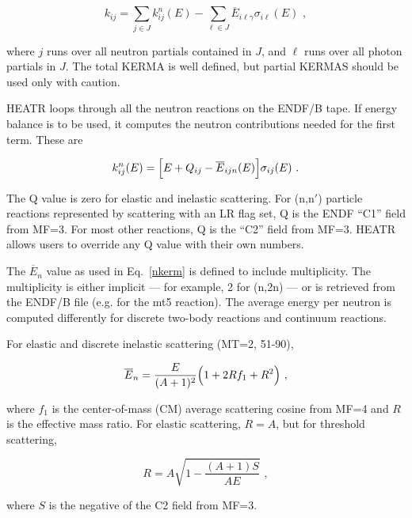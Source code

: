 \begin{equation}
   k_{ij}=\sum_{j\in J}k_{ij}^n(E)-\sum_{\ell\in J}
    \overline{E}_{i\ell\gamma}\sigma_{i\ell}(E)\,\,,
\label{reordered}
\end{equation}
\vspace{0.5 pt}

\noindent
where $j$ runs over all neutron partials contained in $J$, and
$\ell$ runs over all photon partials in $J$.  The total KERMA is
well defined, but partial KERMAS should be used only with caution.

HEATR loops through all the neutron reactions on the ENDF/B tape.
If energy balance is to be used, it computes the neutron
contributions needed for the first term.  These are

\begin{equation}
   k_{ij}^n(E)=
    \Bigl[E+Q_{ij}-\overline{E}_{ijn}(E)\Bigr]\sigma_{ij}(E)\,\,.
\label{nkerm}
\end{equation}
\vspace{0.5 pt}

The Q value is zero for elastic and inelastic scattering.  For
(n,n$'$) particle reactions represented by scattering with an
LR flag set, Q is the ENDF ``C1'' field from MF=3.  For most
other reactions, Q is the ``C2'' field from MF=3.  HEATR allows
users to override any Q value with their own numbers.

The $\overline{E}_n$ value as used in Eq.~\ref{nkerm} is
defined to include multiplicity.  The multiplicity is either
implicit --- for example, 2 for (n,2n) --- or is retrieved from the
ENDF/B file (e.g. for the mt5 reaction).  The average energy per
neutron is computed differently for discrete two-body reactions
and continuum reactions.

For elastic and discrete inelastic scattering (MT=2, 51-90),

\begin{equation}
   \overline{E}_n=\frac{E}{(A+1)^2}\Bigl(1+2Rf_1+R^2\Bigr)\,\,,
\label{enb}
\end{equation}

\noindent
where $f_1$ is the center-of-mass (CM) average scattering cosine
from MF=4 and $R$ is the effective mass ratio.  For elastic
scattering, $R{=}A$, but for threshold scattering,

\begin{equation}
   R=A\sqrt{1-\frac{(A+1)S}{AE}}\,\,,
\end{equation}

\noindent
where $S$ is the negative of the C2 field from MF=3.

